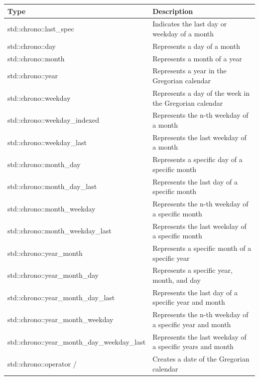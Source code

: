\begin{table}[H]
\centering
\begin{tabular}{ll}
\textbf{Type}                 & \textbf{Description}                                   \\ \hline
std::chrono::last\_spec       & Indicates the last day or weekday of a month           \\
std::chrono::day              & Represents a day of a month                            \\
std::chrono::month            & Represents a month of a year                           \\
std::chrono::year             & Represents a year in the Gregorian calendar            \\
std::chrono::weekday          & Represents a day of the week in the Gregorian calendar \\
std::chrono::weekday\_indexed & Represents the n-th weekday of a month                 \\
std::chrono::weekday\_last    & Represents the last weekday of a month                 \\
std::chrono::month\_day       & Represents a specific day of a specific month          \\
std::chrono::month\_day\_last & Represents the last day of a specific month            \\
std::chrono::month\_weekday   & Represents the n-th weekday of a specific month        \\
std::chrono::month\_weekday\_last            & Represents the last weekday of a specific month           \\
std::chrono::year\_month      & Represents a specific month of a specific year         \\
std::chrono::year\_month\_day & Represents a specific year, month, and day             \\
std::chrono::year\_month\_day\_last          & Represents the last day of a specific year and month      \\
std::chrono::year\_month\_weekday            & Represents the n-th weekday of a specific year and month  \\
std::chrono::year\_month\_day\_weekday\_last & Represents the last weekday of a specific years and month \\
std::chrono::operator /       & Creates a date of the Gregorian calendar              
\end{tabular}
\end{table}

